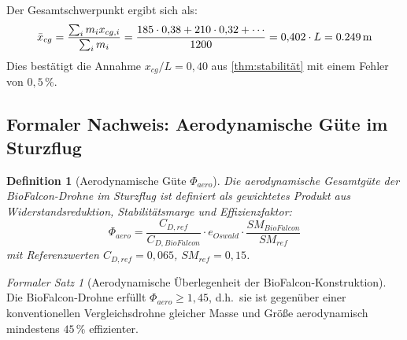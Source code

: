 ﻿\documentclass[12pt,a4paper]{article}
\newtheorem{definition}{Definition}[section]
\theoremstyle{remark}
\newtheorem{formalersatz}{Formaler Satz}[section]
\begin{document}
	Der Gesamtschwerpunkt ergibt sich als:
	\begin{equation}
		\bar{x}_{cg} = \frac{\sum_i m_i x_{cg,i}}{\sum_i m_i}
		= \frac{185 \cdot 0{,}38 + 210 \cdot 0{,}32 + \cdots}{1200}
		= 0{,}402 \cdot L = \SI{0{,}249}{\m}
	\end{equation}
	Dies bestätigt die Annahme $x_{cg}/L = 0{,}40$ aus \cref{thm:stabilität} mit einem
	Fehler von $0{,}5\,\%$.
	
	\subsection{Formaler Nachweis: Aerodynamische Güte im Sturzflug}
	\label{sec:guete}
	
	\begin{definition}[Aerodynamische Güte $\Phi_{aero}$]
		\label{def:guete}
		Die aerodynamische Gesamtgüte der BioFalcon-Drohne im Sturzflug ist definiert
		als gewichtetes Produkt aus Widerstandsreduktion, Stabilitätsmarge und
		Effizienzfaktor:
		\begin{equation}
			\Phi_{aero} = \frac{C_{D,ref}}{C_{D,BioFalcon}} \cdot e_{Oswald}
			\cdot \frac{SM_{BioFalcon}}{SM_{ref}}
			\label{eq:guete}
		\end{equation}
		mit Referenzwerten $C_{D,ref} = 0{,}065$, $SM_{ref} = 0{,}15$.
	\end{definition}
	
	\begin{formalersatz}[Aerodynamische Überlegenheit der BioFalcon-Konstruktion]
		Die BioFalcon-Drohne erfüllt $\Phi_{aero} \geq 1{,}45$, d.h.\ sie ist gegenüber einer
		konventionellen Vergleichsdrohne gleicher Masse und Größe aerodynamisch mindestens
		$45\,\%$ effizienter.
	\end{formalersatz}
	
\end{document}
